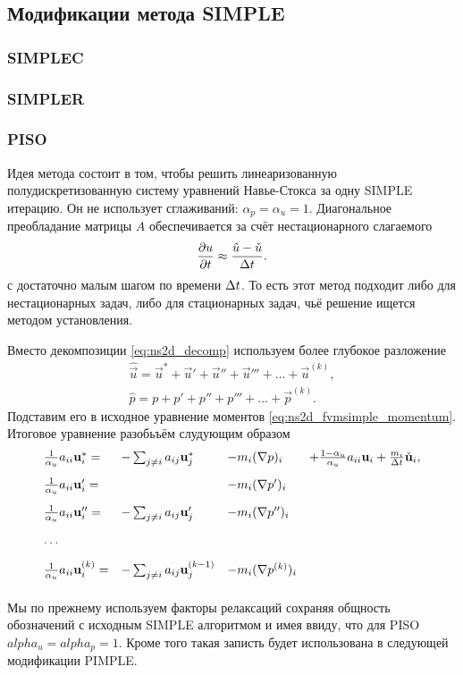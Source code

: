 \subsection{Модификации метода SIMPLE}
\subsubsection{SIMPLEC}

\subsubsection{SIMPLER}

\subsubsection{PISO}
\label{sec:fvm_piso_steps}
Идея метода состоит в том, чтобы решить
линеаризованную полудискретизованную систему уравнений Навье-Стокса
за одну SIMPLE итерацию.
Он не использует сглаживаний: $\alpha_p = \alpha_u = 1$.
Диагональное преобладание матрицы $A$ обеспечивается за счёт нестационарного слагаемого
$$\frac{\partial u}{\partial t} \approx \frac{\hat u - \check u}{\Delta t}. $$
с достаточно малым шагом по времени $\Delta t$.
То есть этот метод подходит либо для нестационарных задач,
либо для стационарных задач, чьё решение ищется методом установления.

Вместо декомпозиции \cref{eq:ns2d_decomp}
используем более глубокое разложение
\begin{equation}
    \label{eq:ns2d_piso_decomp}
\begin{array}{l}
    \hat{\vec u} = \vec u^* + \vec u' + \vec u'' + \vec u''' + \dots + \vec u^{(k)},\\
    \hat p = p + p' + p'' + p''' + \dots + \vec p^{(k)}.
\end{array}
\end{equation}
Подставим его в исходное уравнение
моментов
\cref{eq:ns2d_fvmsimple_momentum}.
Итоговое уравнение разобьъём слудующим образом
\begin{equation}
\label{eq:ns2d_piso_momentum}
\begin{array}{llll}
\frac{1}{\alpha_u} a_{ii} \boldsymbol{\rm u}^*_i = &-\sum_{j\neq i} a_{ij} \boldsymbol{\rm u}^*_j &- m_i (\nabla p)_i  &+ \frac{1 - \alpha_u}{\alpha_u} a_{ii} \boldsymbol{\rm u}_i + \frac{m_i}{\Delta t}\check{\boldsymbol{\rm u}}_i, \\[10pt]
\frac{1}{\alpha_u} a_{ii} \boldsymbol{\rm u}'_i  = &                                  &- m_i (\nabla p')_i &\\[10pt]
\frac{1}{\alpha_u} a_{ii} \boldsymbol{\rm u}''_i = &-\sum_{j\neq i} a_{ij} \boldsymbol{\rm u}'_j   &- m_i (\nabla p'')_i &\\[10pt]
\dots &&&\\[10pt]
\frac{1}{\alpha_u} a_{ii} \boldsymbol{\rm u}^{(k)}_i =&-\sum_{j\neq i} a_{ij} \boldsymbol{\rm u}^{(k-1)}_j &- m_i (\nabla p^{(k)})_i &\\[10pt]
\end{array}
\end{equation}
Мы по прежнему используем факторы релаксаций сохраняя общность обозначений с исходным SIMPLE алгоритмом и имея ввиду, что для PISO $alpha_u = alpha_p = 1$.
Кроме того такая записть будет использована в следующей модификации PIMPLE.

